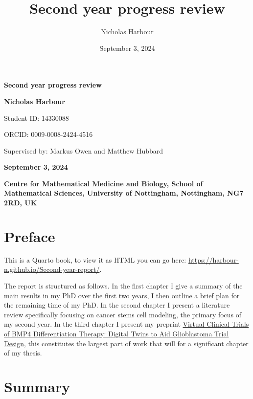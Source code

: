 \documentclass[
  letterpaper,
]{scrreprt}
\title{Second year progress review}
\author{Nicholas Harbour}
\date{September 3, 2024}
\renewcommand*\contentsname{Table of contents}
\newcommand\contentsname{Table of contents}
\theoremstyle{definition}
\theoremstyle{remark}
\begin{document}
\cleardoublepage
\thispagestyle{empty}
{\centering
{\Huge\bfseries Second year progress review \par}
\vspace{12ex}
{\Large\bfseries Nicholas Harbour \par}
{\Large Student ID: 14330088 \par}
{\Large ORCID: 0009-0008-2424-4516 \par}
{\Large Supervised by: Markus Owen and Matthew Hubbard\par}
{\bfseries\large September 3, 2024 \par}
\vspace{12ex}
%
%
{\bfseries\large Centre for Mathematical Medicine and Biology, School of
Mathematical Sciences, University of Nottingham, Nottingham, NG7 2RD,
UK \par}
%
}

\renewcommand*\contentsname{Table of contents}
{
\hypersetup{linkcolor=}
\setcounter{tocdepth}{2}
\tableofcontents
}


\chapter*{Preface}\label{preface}


This is a Quarto book, to view it as HTML you can go here:
\url{https://harbour-n.github.io/Second-year-report/}.

The report is structured as follows. In the first chapter I give a
summary of the main results in my PhD over the first two years, I then
outline a brief plan for the remaining time of my PhD. In the second
chapter I present a literature review specifically focusing on cancer
stems cell modeling, the primary focus of my second year. In the third
chapter I present my preprint
\href{https://www.biorxiv.org/content/10.1101/2024.08.22.609156v1.abstract}{Virtual
Clinical Trials of BMP4 Differentiation Therapy: Digital Twins to Aid
Glioblastoma Trial Design}, this constitutes the largest part of work
that will for a significant chapter of my thesis.


\chapter{Summary}\label{summary}
\end{document}
